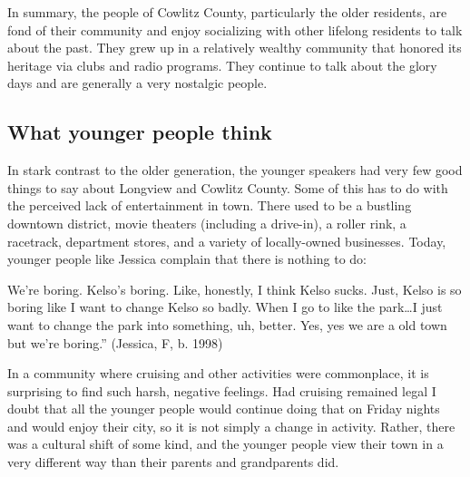 In summary, the people of Cowlitz County, particularly the older residents, are fond of their community and enjoy socializing with other lifelong residents to talk about the past. They grew up in a relatively wealthy community that honored its heritage via clubs and radio programs. They continue to talk about the glory days and are generally a very nostalgic people.

\subsection{What younger people think}

In stark contrast to the older generation, the younger speakers had very few good things to say about Longview and Cowlitz County. Some of this has to do with the perceived lack of entertainment in town. There used to be a bustling downtown district, movie theaters (including a drive-in), a roller rink, a racetrack, department stores, and a variety of locally-owned businesses. Today, younger people like Jessica complain that there is nothing to do:
\begin{num_quote}
    We're boring. Kelso's boring. Like, honestly, I think Kelso sucks. Just, Kelso is so boring like I want to change Kelso so badly. When I go to like the park\ldots I just want to change the park into something, uh, better. Yes, yes we are a old town but we're boring.'' (Jessica, F, b. 1998)
    \label{quote:kelso_sucks}
\end{num_quote}
In a community where cruising and other activities were commonplace, it is surprising to find such harsh, negative feelings. Had cruising remained legal I doubt that all the younger people would continue doing that on Friday nights and would enjoy their city, so it is not simply a change in activity. Rather, there was a cultural shift of some kind, and the younger people view their town in a very different way than their parents and grandparents did.

